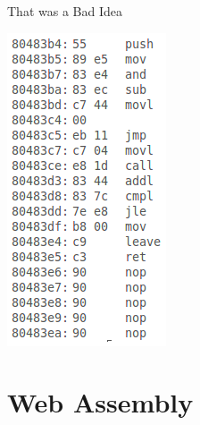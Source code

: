\documentclass{lug}
\newcommand{\pmidg}[1]{\parbox{\widthof{#1}}{#1}}
\begin{document}
\begin{frame}{That was a Bad Idea}
{    }{\pmidg{
        \includegraphics[width=\columnwidth]{graphics/machine_code}
    }}
\end{frame}

\renewcommand{\secimage}{graphics/wasm_logo}
\section{Web Assembly}
\end{document}
